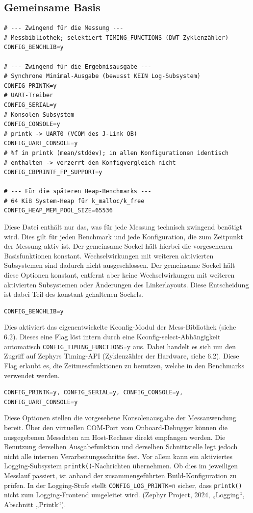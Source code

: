 \subsection{Gemeinsame Basis}
\begin{lstlisting}[style=basecode,language=Kconfig]
# --- Zwingend für die Messung ---
# Messbibliothek; selektiert TIMING_FUNCTIONS (DWT-Zyklenzähler)
CONFIG_BENCHLIB=y

# --- Zwingend für die Ergebnisausgabe ---
# Synchrone Minimal-Ausgabe (bewusst KEIN Log-Subsystem)
CONFIG_PRINTK=y
# UART-Treiber
CONFIG_SERIAL=y
# Konsolen-Subsystem
CONFIG_CONSOLE=y
# printk -> UART0 (VCOM des J-Link OB)
CONFIG_UART_CONSOLE=y
# %f in printk (mean/stddev); in allen Konfigurationen identisch
# enthalten -> verzerrt den Konfigvergleich nicht
CONFIG_CBPRINTF_FP_SUPPORT=y

# --- Für die späteren Heap-Benchmarks ---
# 64 KiB System-Heap für k_malloc/k_free
CONFIG_HEAP_MEM_POOL_SIZE=65536
\end{lstlisting}
Diese Datei enthält nur das, was für jede Messung technisch zwingend benötigt wird. Dies gilt für jeden Benchmark und jede Konfiguration, die zum Zeitpunkt der Messung aktiv ist. Der gemeinsame Sockel hält hierbei die vorgesehenen Basisfunktionen konstant. Wechselwirkungen mit weiteren aktivierten Subsystemen sind dadurch nicht ausgeschlossen. Der gemeinsame Sockel hält diese Optionen konstant, entfernt aber keine Wechselwirkungen mit weiteren aktivierten Subsystemen oder Änderungen des Linkerlayouts. Diese Entscheidung ist dabei Teil des konstant gehaltenen Sockels.

\lstinline[style=fileinline]|CONFIG_BENCHLIB=y|

Dies aktiviert das eigenentwickelte Kconfig-Modul der Mess-Bibliothek (siehe 6.2). Dieses eine Flag löst intern durch eine Kconfig-select-Abhängigkeit automatisch \lstinline[style=fileinline]|CONFIG_TIMING_FUNCTIONS=|y aus. Dabei handelt es sich um den Zugriff auf Zephyrs Timing-API (Zyklenzähler der Hardware, siehe 6.2). Diese Flag erlaubt es, die Zeitmessfunktionen zu benutzen, welche in den Benchmarks verwendet werden.

\lstinline[style=fileinline]|CONFIG_PRINTK=y, CONFIG_SERIAL=y, CONFIG_CONSOLE=y, CONFIG_UART_CONSOLE=y|

Diese Optionen stellen die vorgesehene Konsolenausgabe der Messanwendung bereit. Über den virtuellen COM-Port vom Onboard-Debugger können die ausgegebenen Messdaten am Host-Rechner direkt empfangen werden. Die Benutzung derselben Ausgabefunktion und derselben Schnittstelle legt jedoch nicht alle internen Verarbeitungsschritte fest. Vor allem kann ein aktiviertes Logging-Subsystem \lstinline[style=fileinline]|printk()|-Nachrichten übernehmen. Ob dies im jeweiligen Messlauf passiert, ist anhand der zusammengeführten Build-Konfiguration zu prüfen. In der Logging-Stufe stellt \lstinline[style=fileinline]|CONFIG_LOG_PRINTK=n| sicher, dass \lstinline[style=fileinline]|printk()| nicht zum Logging-Frontend umgeleitet wird. (Zephyr Project, 2024, „Logging“, Abschnitt „Printk“).

